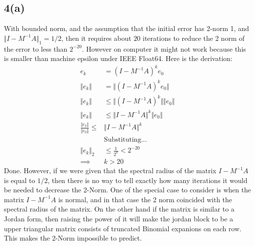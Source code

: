 \documentclass[]{article}
\begin{document}
    \subsection*{4(a)}
        With bounded norm, and the assumption that the initial error has 2-norm 1, and $\Vert I - M^{-1}A\Vert_1 = 1/2$, then it requires about $20$ iterations to reduce the 2 norm of the error to less than $2^{-20}$. However on computer it might not work because this is smaller than machine epsilon under IEEE Float64. Here is the derivation: 
        \begin{align*}\tag{5.a.1}\label{eqn:5.a.1}
            e_k &= (I - M^{-1}A)^ke_0
            \\
            \Vert e_k\Vert &= 
            \Vert (I - M^{-1}A)^ke_0\Vert
            \\
            \Vert e_k\Vert 
            &\le 
            \Vert (I - M^{-1}A)^k\Vert \Vert e_0\Vert
            \\
            \Vert e_k\Vert
            &\le
            \Vert I - M^{-1}A\Vert^k \Vert e_0\Vert 
            \\
            \frac{\Vert e_k\Vert}{\Vert e_0\Vert}
            \le& \Vert I - M^{-1}A\Vert^k
            \\
            & \text{Substituting...}
            \\
            \Vert e_k\Vert_2 &\le \frac{1}{2^k} < 2^{-20}
            \\
            \implies& k > 20
        \end{align*}
        Done. However, if we were given that the spectral radius of the matrix $I - M^{-1}A$ is equal to $1/2$, then there is no way to tell exactly how many iterations it would be needed to decrease the 2-Norm. One of the special case to consider is when the matrix $I - M^{-1}A$ is normal, and in that case the 2 norm coincided with the spectral radius of the matrix. On the other hand if the matrix is similar to a Jordan form, then raising the power of it will make the jordan block to be a upper triangular matrix consists of truncated Binomial expanions on each row. This makes the 2-Norm impossible to predict. 
\end{document}
